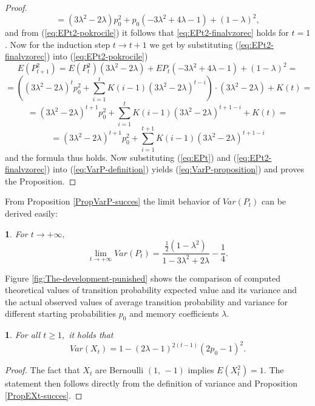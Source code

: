 \documentclass{amsart}
\theoremstyle{definition}
\theoremstyle{plain}
\newtheorem{prop}[thm]{\protect\propositionname}
\theoremstyle{plain}
\newtheorem{cor}[thm]{\protect\corollaryname}
\theoremstyle{plain}
\numberwithin{equation}{section}
\providecommand{\corollaryname}{Corollary}
\providecommand{\propositionname}{Proposition}
\begin{document}
\begin{proof}
\[        \]
        \[
            =(3\lambda^{2}-2\lambda)p_{0}^{2}+p_{0}(-3\lambda^{2}+4\lambda-1)+(1-\lambda)^{2},
        \]
        and from (\ref{eq:EPt2-pokrocile}) it follows that \eqref{eq:EPt2-finalvzorec}
        holds for $t=1$. Now for the induction step $t\rightarrow t+1$ we get by substituting
        (\ref{eq:EPt2-finalvzorec}) into (\ref{eq:EPt2-pokrocile})
        \[
            E(P_{t+1}^{2})=E(P_{t}^{2})(3\lambda^{2}-2\lambda)+EP_{t}(-3\lambda^{2}+4\lambda-1)+(1-\lambda)^{2}=
        \]
        \[
            =((3\lambda^{2}-2\lambda)^{t}p_{0}^{2}+\sum_{i=1}^{t}K(i-1)(3\lambda^{2}-2\lambda)^{t-i})\cdot(3\lambda^{2}-2\lambda)+K(t)=
        \]
        \[
            =(3\lambda^{2}-2\lambda)^{t+1}p_{0}^{2}+\sum_{i=1}^{t}K(i-1)(3\lambda^{2}-2\lambda)^{t+1-i}+K(t)=
        \]
        \[
            =(3\lambda^{2}-2\lambda)^{t+1}p_{0}^{2}+\sum_{i=1}^{t+1}K(i-1)(3\lambda^{2}-2\lambda)^{t+1-i}
        \]
        and the formula thus holds. Now substituting (\ref{eq:EPt}) and (\ref{eq:EPt2-finalvzorec})
        into (\ref{eq:VarP-definition}) yields (\ref{eq:VarP-proposition})
        and proves the Proposition.
    \end{proof}
    From Proposition \ref{PropVarP-succes} the limit behavior of $Var(P_{t})$
    can be derived easily:

    \begin{cor}
        For $t\rightarrow+\infty,$ \textup{
            \begin{equation}
                \lim_{t\to+\infty}Var(P_{t})=\frac{\frac{1}{2}(1-\lambda^{2})}{1-3\lambda^{2}+2\lambda}-\frac{1}{4}.\label{eq:CoroVarpt-statement}
            \end{equation}
        }
    \end{cor}

    Figure \ref{fig:The-development-punished} shows the comparison of
    computed theoretical values of transition probability expected value and its variance and the actual observed values of average transition
    probability and variance for different starting probabilities $p_{0}$
    and memory coefficients $\lambda$.


    \begin{prop}
        \label{propVarX}
        For all $t\geq1,$ it holds that
        \begin{equation}
            Var(X_{t})=1-(2\lambda-1)^{2(t-1)}(2p_{0}-1)^2.
        \end{equation}
    \end{prop}
    \begin{proof}
        The fact that $X_t$ are Bernoulli $(1,\,-1)$ implies $E(X_{t}^2)=1$. The statement then follows directly from the definition of variance and Proposition \ref{PropEXt-succes}.
    \end{proof}
\end{document}
